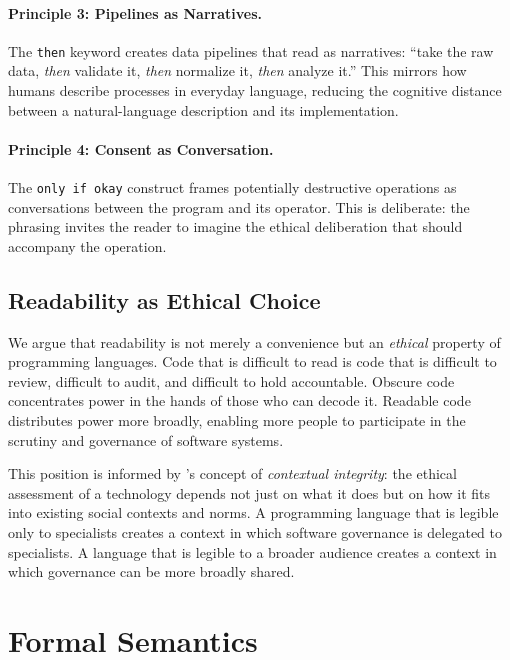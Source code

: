 \documentclass[11pt,a4paper]{article}
\begin{document}
\paragraph{Principle 3: Pipelines as Narratives.}
The \texttt{then} keyword creates data pipelines that read as
narratives: ``take the raw data, \emph{then} validate it, \emph{then}
normalize it, \emph{then} analyze it.''  This mirrors how humans
describe processes in everyday language, reducing the cognitive
distance between a natural-language description and its implementation.

\paragraph{Principle 4: Consent as Conversation.}
The \texttt{only if okay} construct frames potentially destructive
operations as conversations between the program and its operator.
This is deliberate: the phrasing invites the reader to imagine the
ethical deliberation that should accompany the operation.

\subsection{Readability as Ethical Choice}

We argue that readability is not merely a convenience but an
\emph{ethical} property of programming languages.  Code that is
difficult to read is code that is difficult to review, difficult to
audit, and difficult to hold accountable.  Obscure code concentrates
power in the hands of those who can decode it.  Readable code
distributes power more broadly, enabling more people to participate in
the scrutiny and governance of software systems.

This position is informed by \citet{nissenbaum2004privacy}'s concept
of \emph{contextual integrity}: the ethical assessment of a technology
depends not just on what it does but on how it fits into existing
social contexts and norms.  A programming language that is legible
only to specialists creates a context in which software governance is
delegated to specialists.  A language that is legible to a broader
audience creates a context in which governance can be more broadly
shared.

\section{Formal Semantics}
\label{sec:semantics}
\end{document}
